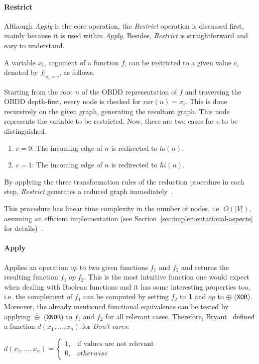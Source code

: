 \documentclass{vldb}
\begin{document}
\paragraph*{Restrict}
\mbox{} %

Although \textit{Apply} is the core operation, the \textit{Restrict} operation is
discussed first, mainly because it is used within \textit{Apply}. Besides,
\textit{Restrict} is straightforward and easy to understand.

A variable $x_i$, argument of a function $f$, can be restricted to a given value
$c$, denoted by $f|_{x_i=c}$, as follows.

Starting from the root $n$ of the OBDD representation of $f$ and traversing the
OBDD depth-first, every node is checked for $var(n) = x_i$. This is done recursively
on the given graph, generating the resultant graph. This node represents
the variable to be restricted. Now, there are two cases for $c$ to be
distinguished. 

\clearpage
\begin{enumerate}
    \item{$c=0$: The incoming edge of $n$ is redirected to $lo(n)$.}
    \item{$c=1$: The incoming edge of $n$ is redirected to $hi(n)$.}
\end{enumerate}

By applying the three transformation rules of the reduction procedure in each
step, \textit{Restrict} generates a reduced graph immediately~\cite{BRYANT92}.

This procedure has linear time complexity in the number of nodes, i.e. $O(|V|)$,
assuming an efficient implementation (see
Section~\ref{sec:implementational-aspects} for details)~\cite{BRYANT92}.

\paragraph*{Apply}
\mbox{} %

Applies an operation $op$ to two given functions $f_1$ and $f_2$ and returns the
resulting function $f_1\;op\;f_2$. This is the most intuitive function one would
expect when dealing with Boolean functions and it has some interesting properties
too, i.e. the complement of $f_1$ can be computed by setting $f_2$ to \textbf{1}
and $op$ to $\oplus$ (\texttt{XOR}). Moreover, the already mentioned functional
equivalence can be tested by applying $\overline{\oplus}$ (\texttt{XNOR}) to
$f_1$ and $f_2$ for all relevant cases. Therefore, Bryant~\cite{BRYANT92} defined
a function $d(x_1, \ldots, x_n)$ for \textit{Don't cares}:
\begin{center}
$d(x_1, \ldots, x_n)=
\begin{cases}
    1, & \text{if values are not relevant} \\
    0, & otherwise
\end{cases}
$
\end{center}
\end{document}

